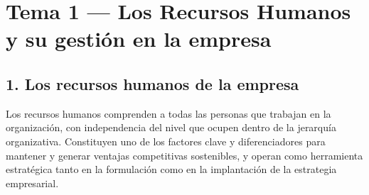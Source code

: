 \documentclass[12pt]{book} %
\begin{document}
\newpage
\thispagestyle{empty}
\mbox{}

\newpage
\thispagestyle{empty}
\mbox{}






\tableofcontents
\clearpage
\thispagestyle{empty} %

%
%

\hypertarget{tema-1-los-recursos-humanos-y-su-gestiuxf3n-en-la-empresa}{%
\chapter{Tema 1 --- Los Recursos Humanos y su gestión en la
empresa}\label{tema-1-los-recursos-humanos-y-su-gestiuxf3n-en-la-empresa}}

\hypertarget{los-recursos-humanos-de-la-empresa}{%
\section{1. Los recursos humanos de la
empresa}\label{los-recursos-humanos-de-la-empresa}}

Los recursos humanos comprenden a todas las personas que trabajan en la
organización, con independencia del nivel que ocupen dentro de la
jerarquía organizativa. Constituyen uno de los factores clave y
diferenciadores para mantener y generar ventajas competitivas
sostenibles, y operan como herramienta estratégica tanto en la
formulación como en la implantación de la estrategia empresarial.
\end{document}
